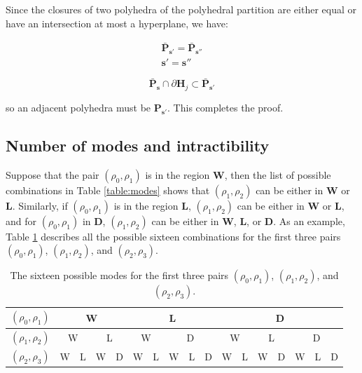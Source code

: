 \documentclass[11pt]{article}
\numberwithin{equation}{section}
\numberwithin{figure}{section}
\numberwithin{table}{section}
\begin{document}
\noindent Since the closures of two polyhedra of the polyhedral partition are either equal or have an intersection at most a hyperplane, we have:

\begin{equation}
\begin{array}{l}
\bar{\textbf{P}}_{\boldsymbol s'}=\bar{\textbf{P}}_{\boldsymbol s''}\\
\boldsymbol s'=\boldsymbol s''
\end{array}
\label{eq:adjacency5}
\end{equation}

\begin{equation}
\bar{\textbf{P}}_{\boldsymbol s}\cap \partial \textbf{H}_{j}\subset \bar{\textbf{P}}_{\boldsymbol s'}
\label{eq:adjacency6}
\end{equation}

\noindent so an adjacent polyhedra must be $\textbf{P}_{\boldsymbol s'}$. This completes the proof.


\subsection{Number of modes and intractibility}\label{sec:modes}

Suppose that the pair $(\rho_{0},\rho_{1})$ is in the region \textbf{W}, then the list of possible combinations in Table \ref{table:modes} shows that $(\rho_{1},\rho_{2})$ can be either in \textbf{W} or \textbf{L}. Similarly, if $(\rho_{0},\rho_{1})$ is in the region \textbf{L}, $(\rho_{1},\rho_{2})$ can be either in \textbf{W} or \textbf{L}, and for $(\rho_{0},\rho_{1})$ in \textbf{D}, $(\rho_{1},\rho_{2})$ can be either in \textbf{W}, \textbf{L}, or \textbf{D}. As an example, Table \ref{table:threeLevelModes} describes all the possible sixteen combinations for the first three pairs $(\rho_{0},\rho_{1})$, $(\rho_{1},\rho_{2})$, and $(\rho_{2},\rho_{3})$.

\begin{table}[ht]
\centering %
\begin{tabular}{|c|c|c|c|c|c|c|c|c|c|c|c|c|c|c|c|c|}
  \hline
  $(\rho_{0},\rho_{1})$ & \multicolumn{4}{|c|}{W} & \multicolumn{5}{|c|}{L} & \multicolumn{7}{|c|}{D}\\
  \hline
  $(\rho_{1},\rho_{2})$ & \multicolumn{2}{|c|}{W} & \multicolumn{2}{|c|}{L} & \multicolumn{2}{|c|}{W} & \multicolumn{3}{|c|}{D} & \multicolumn{2}{|c|}{W} & \multicolumn{2}{|c|}{L} & \multicolumn{3}{|c|}{D}\\
  \hline
  $(\rho_{2},\rho_{3})$ & W & L & W & D & W & L & W & L & D & W & L & W & D & W & L & D\\
  \hline
\end{tabular}
\label{table:threeLevelModes} %
\caption{The sixteen possible modes for the first three pairs $(\rho_{0},\rho_{1})$, $(\rho_{1},\rho_{2})$, and $(\rho_{2},\rho_{3})$.}
\end{table}
\end{document}
